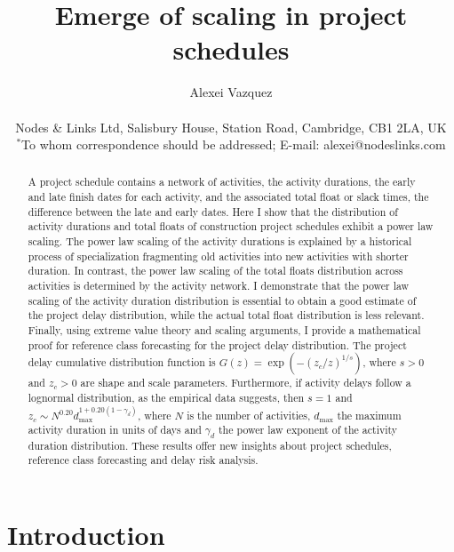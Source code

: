 \documentclass[11pt]{article}
\title{Emerge of scaling in project schedules}
\author{Alexei Vazquez\\
\\
\normalsize{Nodes \& Links Ltd, Salisbury House, Station Road, Cambridge, CB1 2LA, UK}
\\
\normalsize{$^\ast$To whom correspondence should be addressed; E-mail: alexei@nodeslinks.com}
}
\date{}
\begin{document}

\maketitle

\begin{abstract}
A project schedule contains a network of activities, the activity durations, the early and late finish dates for each activity, and the associated total float or slack times, the difference between the late and early dates. Here I show that the distribution of activity durations and total floats of construction project schedules exhibit a power law scaling. The power law scaling of the activity durations is explained by a historical process of specialization fragmenting old activities into new activities with shorter duration. In contrast, the power law scaling of the total floats distribution across activities is determined by the activity network. I demonstrate that the power law scaling of the activity duration distribution is essential to obtain a good estimate of the project delay distribution, while the actual total float distribution is less relevant. Finally, using extreme value theory and scaling arguments, I provide a mathematical proof for reference class forecasting for the project delay distribution. The project delay cumulative distribution function is  $G(z) = \exp( - (z_c/z)^{1/s})$, where $s>0$ and $z_c>0$ are shape and scale parameters. Furthermore, if activity delays follow a lognormal distribution, as the empirical data suggests, then $s=1$ and $z_c \sim N^{0.20}d_{\max}^{1+0.20(1-\gamma_d)}$, where $N$ is the number of activities, $d_{\max}$ the maximum activity duration in units of days and $\gamma_d$ the power law exponent of the activity duration distribution. These results offer new insights about project schedules, reference class forecasting and delay risk analysis.
\end{abstract}

\section{Introduction}
\end{document}

